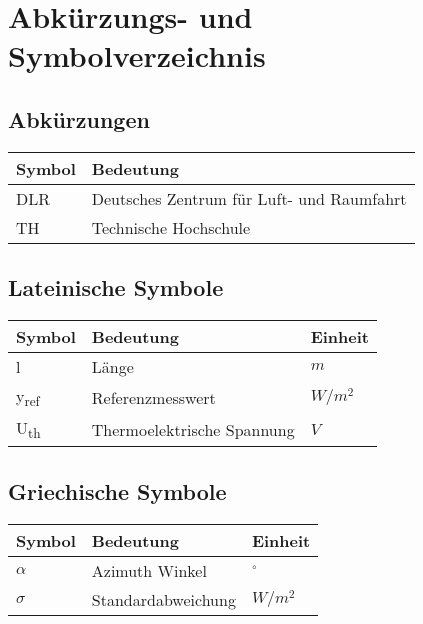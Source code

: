 \chapter*{Abkürzungs- und Symbolverzeichnis}
\renewcommand{\arraystretch}{1.5}
%
\section*{Abkürzungen}
\begin{table}[ht!]
    \centering
    \begin{tabular}{m{}m{}}
        \rowcolor{white}
        Symbol & Bedeutung                                 \\
        \midrule
        DLR    & Deutsches Zentrum für Luft- und Raumfahrt \\
        TH     & Technische Hochschule                     \\
    \end{tabular}
\end{table}
\clearpage
\newpage \vspace*{-1cm}

\section*{Lateinische Symbole}
\begin{table}[ht!]
    \centering
    \begin{tabular}{m{}m{}m{}}
        \rowcolor{white}
        Symbol               & Bedeutung                  & Einheit \\
        \midrule
        l                    & Länge                      & $m$     \\
        y\textsubscript{ref} & Referenzmesswert           & $W/m^2$ \\
        U\textsubscript{th}  & Thermoelektrische Spannung & $V$     \\
    \end{tabular}
\end{table}
\clearpage
\newpage \vspace*{-1cm}

\section*{Griechische Symbole}
\begin{table}[ht!]
    \centering
    \begin{tabular}{m{}m{}m{}}
        \rowcolor{white}
        Symbol   & Bedeutung          & Einheit  \\
        \midrule
        $\alpha$ & Azimuth Winkel     & $^\circ$ \\
        $\sigma$ & Standardabweichung & $W/m^2$  \\
    \end{tabular}
\end{table}
\clearpage
\newpage

